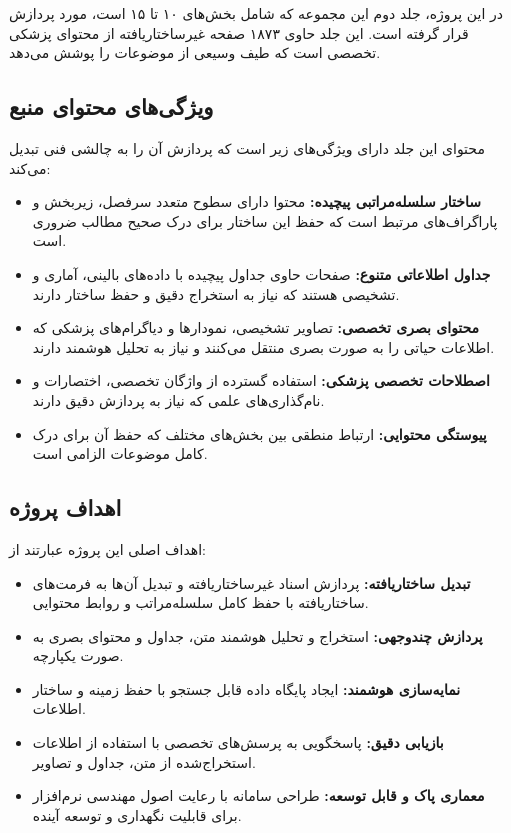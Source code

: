 \noindent
در این پروژه، جلد دوم این مجموعه که شامل بخش‌های ۱۰ تا ۱۵ است، مورد پردازش قرار گرفته است. این جلد حاوی ۱۸۷۳ صفحه غیرساختاریافته از محتوای پزشکی تخصصی است که طیف وسیعی از موضوعات را پوشش می‌دهد.

\subsection{ویژگی‌های محتوای منبع}
محتوای این جلد دارای ویژگی‌های زیر است که پردازش آن را به چالشی فنی تبدیل می‌کند:

\begin{itemize}
    \item \textbf{ساختار سلسله‌مراتبی پیچیده:} محتوا دارای سطوح متعدد سرفصل، زیربخش و پاراگراف‌های مرتبط است که حفظ این ساختار برای درک صحیح مطالب ضروری است.
    
    \item \textbf{جداول اطلاعاتی متنوع:} صفحات حاوی جداول پیچیده با داده‌های بالینی، آماری و تشخیصی هستند که نیاز به استخراج دقیق و حفظ ساختار دارند.
    
    \item \textbf{محتوای بصری تخصصی:} تصاویر تشخیصی، نمودارها و دیاگرام‌های پزشکی که اطلاعات حیاتی را به صورت بصری منتقل می‌کنند و نیاز به تحلیل هوشمند دارند.
    
    \item \textbf{اصطلاحات تخصصی پزشکی:} استفاده گسترده از واژگان تخصصی، اختصارات و نام‌گذاری‌های علمی که نیاز به پردازش دقیق دارند.
    
    \item \textbf{پیوستگی محتوایی:} ارتباط منطقی بین بخش‌های مختلف که حفظ آن برای درک کامل موضوعات الزامی است.
\end{itemize}

\subsection{اهداف پروژه}
اهداف اصلی این پروژه عبارتند از:

\begin{itemize}
    \item \textbf{تبدیل ساختاریافته:} پردازش اسناد غیرساختاریافته  و تبدیل آن‌ها به فرمت‌های ساختاریافته با حفظ کامل سلسله‌مراتب و روابط محتوایی.
    
    \item \textbf{پردازش چندوجهی:} استخراج و تحلیل هوشمند متن، جداول و محتوای بصری به صورت یکپارچه.
    
    \item \textbf{نمایه‌سازی هوشمند:} ایجاد پایگاه داده قابل جستجو با حفظ زمینه و ساختار اطلاعات.
    
    \item \textbf{بازیابی دقیق:} پاسخگویی به پرسش‌های تخصصی با استفاده از اطلاعات استخراج‌شده از متن، جداول و تصاویر.
    
    \item \textbf{معماری پاک و قابل توسعه:} طراحی سامانه با رعایت اصول مهندسی نرم‌افزار برای قابلیت نگهداری و توسعه آینده.
\end{itemize}

